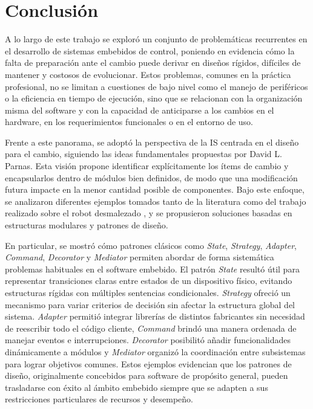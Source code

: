 \chapter{Conclusión}
\label{conclusion}

A lo largo de este trabajo se exploró un conjunto de problemáticas recurrentes en el desarrollo de sistemas embebidos de control, poniendo en evidencia cómo la falta de preparación ante el cambio puede derivar en diseños rígidos, difíciles de mantener y costosos de evolucionar. Estos problemas, comunes en la práctica profesional, no se limitan a cuestiones de bajo nivel como el manejo de periféricos o la eficiencia en tiempo de ejecución, sino que se relacionan con la organización misma del software y con la capacidad de anticiparse a los cambios en el hardware, en los requerimientos funcionales o en el entorno de uso.

Frente a este panorama, se adoptó la perspectiva de la \gls{IS} centrada en el diseño para el cambio, siguiendo las ideas fundamentales propuestas por David L. Parnas. Esta visión propone identificar explícitamente los ítems de cambio y encapsularlos dentro de módulos bien definidos, de modo que una modificación futura impacte en la menor cantidad posible de componentes. Bajo este enfoque, se analizaron diferentes ejemplos tomados tanto de la literatura \cite{douglass} como del trabajo realizado sobre el robot desmalezado \cite{paperPomponio}, y se propusieron soluciones basadas en estructuras modulares y patrones de diseño.

En particular, se mostró cómo patrones clásicos como \textit{State}, \textit{Strategy}, \textit{Adapter}, \textit{Command}, \textit{Decorator} y \textit{Mediator} permiten abordar de forma sistemática problemas habituales en el software embebido. El patrón \textit{State} resultó útil para representar transiciones claras entre estados de un dispositivo físico, evitando estructuras rígidas con múltiples sentencias condicionales. \textit{Strategy} ofreció un mecanismo para variar criterios de decisión sin afectar la estructura global del sistema. \textit{Adapter} permitió integrar librerías de distintos fabricantes sin necesidad de reescribir todo el código cliente, \textit{Command} brindó una manera ordenada de manejar eventos e interrupciones. \textit{Decorator} posibilitó añadir funcionalidades dinámicamente a módulos y \textit{Mediator} organizó la coordinación entre subsistemas para lograr objetivos comunes. Estos ejemplos evidencian que los patrones de diseño, originalmente concebidos para software de propósito general, pueden trasladarse con éxito al ámbito embebido siempre que se adapten a sus restricciones particulares de recursos y desempeño.


